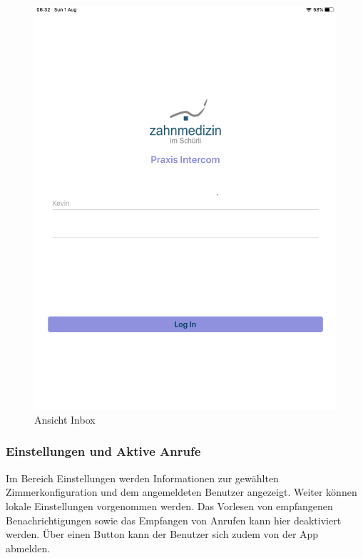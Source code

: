 \begin{figure}[h]
\begin{minipage}[b]{0.4\textwidth}
        \includegraphics[width=\textwidth]{graphics/screenshots/placeholder}
        \caption{Ansicht Inbox}
    \end{minipage}
    \label{fig:MobileClient-Screens2}
\end{figure}

\clearpage

\subsubsection*{Einstellungen und Aktive Anrufe}

Im Bereich Einstellungen werden Informationen zur gewählten Zimmerkonfiguration und dem angemeldeten Benutzer angezeigt.
Weiter können lokale Einstellungen vorgenommen werden.
Das Vorlesen von empfangenen Benachrichtigungen sowie das Empfangen von Anrufen kann hier deaktiviert werden.
Über einen Button kann der Benutzer sich zudem von der App abmelden.

